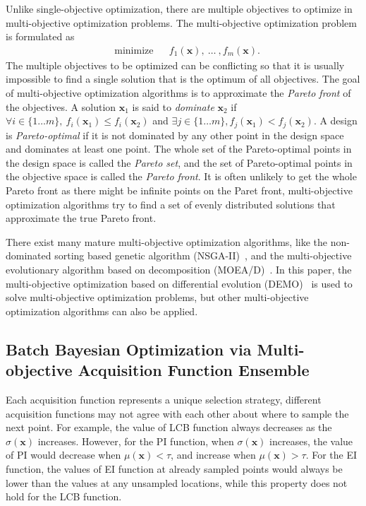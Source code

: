 Unlike single-objective optimization, there are multiple objectives to optimize in multi-objective optimization problems\cite{MO_overview}. The multi-objective optimization problem is formulated as
\begin{equation}
    \label{eq:MOFormulation}
    \begin{aligned}
        & \text{minimize} & & f_1(\bm{x}),~\dots~,f_m(\bm{x}).
    \end{aligned}
\end{equation}
The multiple objectives to be optimized can be conflicting so that it is usually impossible to find a single solution that is the optimum of all objectives. The goal of multi-objective optimization algorithms is to approximate the \emph{Pareto front} of the objectives. A solution $\bm{x}_1$ is said to \emph{dominate} $\bm{x}_2$ if $\forall i \in \{1\dots m\},~f_i(\bm{x}_1) \le f_i(\bm{x}_2)$ and $\exists j \in \{1\dots m\}, f_j(\bm{x}_1) < f_j(\bm{x}_2)$. A design is \emph{Pareto-optimal} if it is not dominated by any other point in the design space and dominates at least one point. The whole set of the Pareto-optimal points in the design space is called the \emph{Pareto set}, and the set of Pareto-optimal points in the objective space is called the \emph{Pareto front}. It is often unlikely to get the whole Pareto front as there might be infinite points on the Paret front, multi-objective optimization algorithms try to find a set of evenly distributed solutions that approximate the true Pareto front.

There exist many mature multi-objective optimization algorithms, like the non-dominated sorting based genetic algorithm (NSGA-II)~\cite{nsgaii}, and the multi-objective evolutionary algorithm based on decomposition (MOEA/D)~\cite{moead}. In this paper, the multi-objective optimization based on differential evolution (DEMO)~\cite{demo} is used to solve multi-objective optimization problems, but other multi-objective optimization algorithms can also be applied.

\subsection{Batch Bayesian Optimization via Multi-objective Acquisition Function Ensemble}

Each acquisition function represents a unique selection strategy, different acquisition functions may not agree with each other about where to sample the next point. For example, the value of LCB function always decreases as the $\sigma(\bm{x})$ increases. However, for the PI function, when $\sigma(\bm{x})$ increases, the value of PI would decrease when $\mu(\bm{x}) < \tau$, and increase when $\mu(\bm{x}) > \tau$. For the EI function, the values of EI function at already sampled points would always be lower than the values at any unsampled locations, while this property does not hold for the LCB function.

